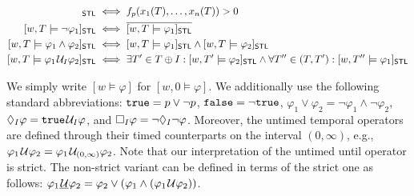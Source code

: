 \small
\begin{align*}
	[w,T \models p]_{\mathsf{STL}} &\iff f_p(x_1(T), \ldots, x_n(T)) > 0 \\
	[w,T \models \lnot \varphi_1]_{\mathsf{STL}} &\iff \overline{[w,T \models \varphi_1]_{\mathsf{STL}}} \\
	[w,T \models \varphi_1 \land \varphi_2]_{\mathsf{STL}} &\iff [w,T \models \varphi_1]_{\mathsf{STL}} \land [w,T \models \varphi_2]_{\mathsf{STL}} \\
	[w,T \models \varphi_1 \until_I \varphi_2]_{\mathsf{STL}} &\iff \exists T' \in T \oplus I : [w,T' \models \varphi_2]_{\mathsf{STL}} \land \forall T'' \in (T, T') : [w,T'' \models \varphi_1]_{\mathsf{STL}} \\
\end{align*}
\normalsize

We simply write $[w \models \varphi]$ for $[w,0 \models \varphi]$.
We additionally use the following standard abbreviations: 
$\texttt{true} = p \lor \lnot p$,
$\texttt{false} = \lnot \texttt{true}$,
$ \varphi_1 \lor \varphi_2 = \lnot \varphi_1 \land \lnot \varphi_2$,
$\lozenge_I \varphi = \texttt{true} \kern.1em\mathcal{U}_I \varphi$, and
$\square_I \varphi = \lnot \lozenge_I \lnot \varphi$.
Moreover, the untimed temporal operators are defined through their timed counterparts on the interval $(0,\infty)$, e.g., $\varphi_1 \kern.1em\mathcal{U} \varphi_2 = \varphi_1 \kern.1em\mathcal{U}_{(0,\infty)} \varphi_2$.
Note that our interpretation of the untimed until operator is strict.
The non-strict variant can be defined in terms of the strict one as follows: $\varphi_1 \underline{\kern.1em\mathcal{U}} \varphi_2 = \varphi_2 \lor (\varphi_1 \land (\varphi_1 \kern.1em\mathcal{U} \varphi_2))$.

